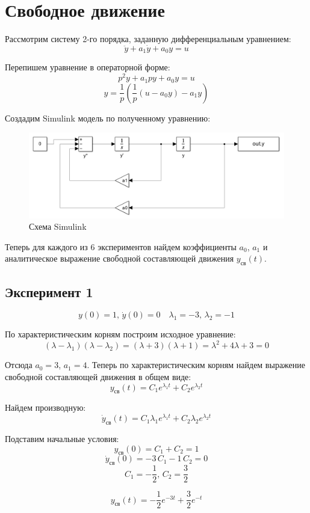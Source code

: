 \chapter{Свободное движение}
Рассмотрим систему 2-го порядка, заданную дифференциальным уравнением:
\[
\ddot y + a_1 \dot y + a_0 y = u
\]

Перепишем уравнение в операторной форме:
\[
p^2 y + a_1 p y + a_0 y = u
\]
\[
y = \frac{1}{p}\left(\frac{1}{p}(u - a_0 y) - a_1 y\right)
\]

Создадим Simulink модель по полученному уравнению:
\begin{figure}[H]
    \centering
    \includegraphics[width=1\textwidth, trim={0cm 0cm 0cm 0cm}]{../images/sim1.png}
    \caption{Схема Simulink}
    \label{fig:sim1}
\end{figure}

Теперь для каждого из 6 экспериментов найдем коэффициенты $a_0$, $a_1$ и аналитическое выражение свободной составляющей движения $y_{\text{св}}(t)$.
\section{Эксперимент 1}
\[y(0) = 1,\, \dot y(0) = 0 \quad \lambda_1 = -3,\, \lambda_2 = -1\]

По характеристическим корням построим исходное уравнение:
\[(\lambda - \lambda_1)(\lambda - \lambda_2) = (\lambda + 3)(\lambda + 1) = \lambda^2 + 4\lambda + 3 = 0\]

Отсюда $a_0 = 3$, $a_1 = 4$. Теперь по характеристическим корням найдем выражение свободной составляющей движения в общем виде:
\[y_{\text{св}}(t) = C_1 e^{\lambda_1 t} + C_2 e^{\lambda_2 t}\]

Найдем производную:
\[\dot y_{\text{св}}(t) = C_1 \lambda_1 e^{\lambda_1 t} + C_2 \lambda_2 e^{\lambda_2 t}\]

Подставим начальные условия:
\[y_{\text{св}}(0) = C_1 + C_2 = 1\]
\[\dot y_{\text{св}}(0) = -3\,C_1 -1\,C_2 = 0\]
\[C_1 = -\frac{1}{2},\, C_2 = \frac{3}{2}\]

\[y_{\text{св}}(t) = -\frac{1}{2}e^{-3t} + \frac{3}{2}e^{-t}\]

